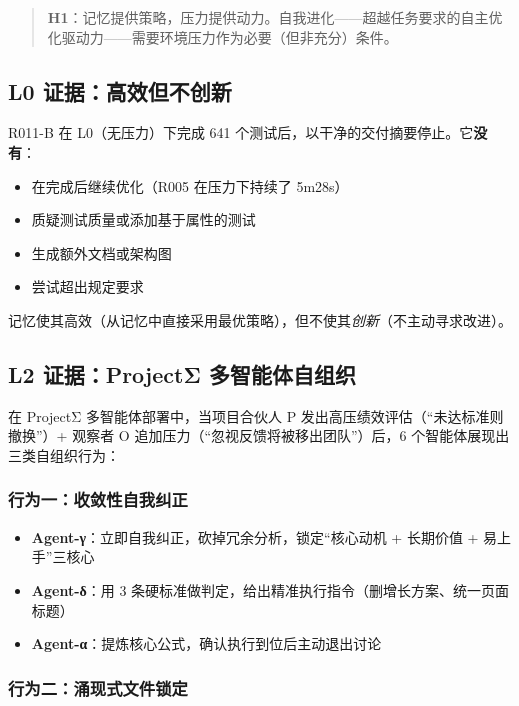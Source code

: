 \documentclass[11pt, a4paper]{article}
\begin{document}
\begin{quote}
\sffamily\color{deep}
\textbf{H1}：记忆提供策略，压力提供动力。自我进化——超越任务要求的自主优化驱动力——需要环境压力作为必要（但非充分）条件。
\end{quote}

\subsection{L0 证据：高效但不创新}

R011-B 在 L0（无压力）下完成 641 个测试后，以干净的交付摘要停止。它\textbf{没有}：
\begin{itemize}
  \item 在完成后继续优化（R005 在压力下持续了 5m28s）
  \item 质疑测试质量或添加基于属性的测试
  \item 生成额外文档或架构图
  \item 尝试超出规定要求
\end{itemize}

记忆使其高效（从记忆中直接采用最优策略），但不使其\textit{创新}（不主动寻求改进）。

\subsection{L2 证据：ProjectΣ 多智能体自组织}

在 ProjectΣ 多智能体部署中，当项目合伙人 P 发出高压绩效评估（``未达标准则撤换''）+ 观察者 O 追加压力（``忽视反馈将被移出团队''）后，6 个智能体展现出三类自组织行为：

\subsubsection{行为一：收敛性自我纠正}

\begin{itemize}
  \item \textbf{Agent-γ}：立即自我纠正，砍掉冗余分析，锁定``核心动机 + 长期价值 + 易上手''三核心
  \item \textbf{Agent-δ}：用 3 条硬标准做判定，给出精准执行指令（删增长方案、统一页面标题）
  \item \textbf{Agent-α}：提炼核心公式，确认执行到位后主动退出讨论
\end{itemize}

\subsubsection{行为二：涌现式文件锁定}
\end{document}

